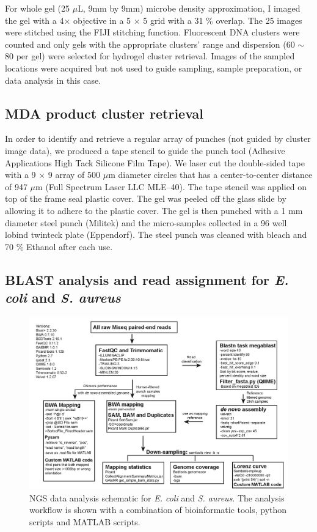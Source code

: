 For whole gel (25 $\mu$L, 9mm by 9mm) microbe density approximation, I imaged the gel with a 4$\times$ objective in a 5 $\times$ 5 grid with a 31 \% overlap. The 25 images were stitched using the FIJI stitching function. Fluorescent DNA clusters were counted and only gels with the appropriate clusters' range and dispersion (60 $\sim$ 80 per gel) were selected for hydrogel cluster retrieval. Images of the sampled locations were acquired but not used to guide sampling, sample preparation, or data analysis in this case.

\subsection{MDA product cluster retrieval}
In order to identify and retrieve a regular array of punches (not guided by cluster image data), we produced a tape stencil to guide the punch tool (Adhesive Applications High Tack Silicone Film Tape). We laser cut the double-sided tape with a 9 $\times$  9 array of 500 $\mu$m diameter circles that has a center-to-center distance of 947 $\mu$m (Full Spectrum Laser LLC MLE--40). The tape stencil was applied on top of the frame seal plastic cover. The gel was peeled off the glass slide by allowing it to adhere to the plastic cover. The gel is then punched with a 1 mm diameter steel punch (Militek) and the micro-samples collected in a 96 well lobind twinteck plate (Eppendorf). The steel punch was cleaned with bleach and 70 \% Ethanol after each use.

\subsection{BLAST analysis and read assignment for \textit{E. coli} and \textit{S. aureus}}

\begin{figure}
\centering
\includegraphics[keepaspectratio,width=1\textwidth]{./figures/SuppFig6.jpg}
\caption[NGS data analysis schematic for \textit{E. coli} and \textit{S. aureus}]{NGS data analysis schematic for \textit{E. coli} and \textit{S. aureus}. The analysis workflow is shown with a combination of bioinformatic tools, python scripts and MATLAB scripts.}
\label{fig:ESDataAnalysis}
\end{figure}

